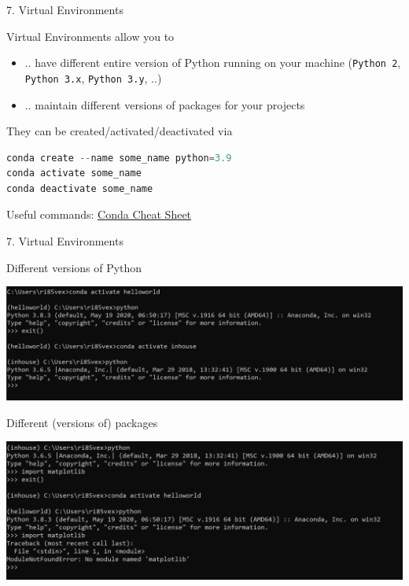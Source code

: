 
\begin{vbframe}{7. Virtual Environments}

\vfill

Virtual Environments allow you to 

\begin{itemize}
	\item .. have different entire version of Python running on your machine (\texttt{Python 2}, \texttt{Python 3.x}, \texttt{Python 3.y}, ..)
	\item .. maintain different versions of packages for your projects
\end{itemize}

\vspace{.3cm}

They can be created/activated/deactivated via

\begin{lstlisting}[language=python]
conda create --name some_name python=3.9
conda activate some_name
conda deactivate some_name
\end{lstlisting}

Useful commands: \href{https://docs.conda.io/projects/conda/en/4.6.0/_downloads/52a95608c49671267e40c689e0bc00ca/conda-cheatsheet.pdf}{Conda Cheat Sheet}

\vfill

\end{vbframe}


\begin{vbframe}{7. Virtual Environments}

\vfill

Different versions of Python

\vspace{.2cm}

\includegraphics[width=.8\textwidth]{figure/envs.png}

Different (versions of) packages

\vspace{.2cm}

\includegraphics[width=.8\textwidth]{figure/envs2.png}

\vfill

\end{vbframe}

